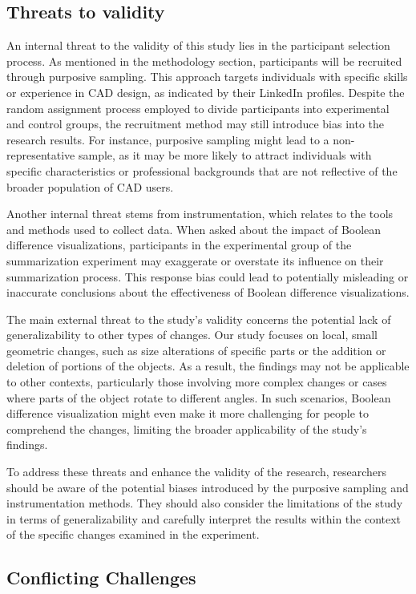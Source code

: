 \documentclass[sigconf,authorversion,nonacm]{acmart}
\begin{document}
\subsection{Threats to validity}
An internal threat to the validity of this study lies in the participant selection process. As mentioned in the methodology section, participants will be recruited through purposive sampling.
This approach targets individuals with specific skills or experience in CAD design, as indicated by their LinkedIn profiles. Despite the random assignment process employed to divide participants into experimental and control groups, the recruitment method may still introduce bias into the research results.
For instance, purposive sampling might lead to a non-representative sample, as it may be more likely to attract individuals with specific characteristics or professional backgrounds that are not reflective of the broader population of CAD users.

Another internal threat stems from instrumentation, which relates to the tools and methods used to collect data. When asked about the impact of Boolean difference visualizations, participants in the experimental group of the summarization experiment may exaggerate or overstate its influence on their summarization process.
This response bias could lead to potentially misleading or inaccurate conclusions about the effectiveness of Boolean difference visualizations.

The main external threat to the study's validity concerns the potential lack of generalizability to other types of changes. Our study focuses on local, small geometric changes, such as size alterations of specific parts or the addition or deletion of portions of the objects.
As a result, the findings may not be applicable to other contexts, particularly those involving more complex changes or cases where parts of the object rotate to different angles.
In such scenarios, Boolean difference visualization might even make it more challenging for people to comprehend the changes, limiting the broader applicability of the study's findings.

To address these threats and enhance the validity of the research, researchers should be aware of the potential biases introduced by the purposive sampling and instrumentation methods.
They should also consider the limitations of the study in terms of generalizability and carefully interpret the results within the context of the specific changes examined in the experiment.

\subsection{Conflicting Challenges}
\end{document}
